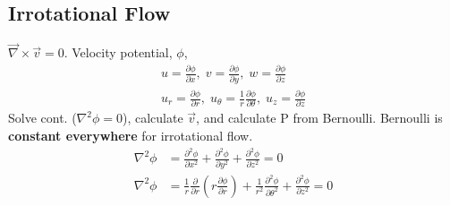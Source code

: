 \subsection{Irrotational Flow}
$\vec{\nabla} \times \vec{v} = 0$. Velocity potential, $\phi$,
\begin{gather*}
    u = \frac{\partial \phi}{\partial x}, \; v = \frac{\partial \phi}{\partial y}, \; w = \frac{\partial \phi}{\partial z} \\
    u_r = \frac{\partial \phi}{\partial r}, \; u_\theta = \frac{1}{r} \frac{\partial \phi}{\partial \theta}, \; u_z = \frac{\partial \phi}{\partial z}
\end{gather*}
Solve cont. ($\nabla^2 \phi = 0$), calculate $\vec{v}$, and calculate P from Bernoulli. Bernoulli is \textbf{constant everywhere} for irrotational flow.
\begin{align*}
    \nabla^2 \phi &= \frac{\partial^2 \phi}{\partial x^2} + \frac{\partial^2 \phi}{\partial y^2} + \frac{\partial^2 \phi}{\partial z^2} = 0\\
    \nabla^2 \phi &= \frac{1}{r} \frac{\partial}{\partial r} \left(r \frac{\partial \phi}{\partial r}\right) + \frac{1}{r^2} \frac{\partial^2 \phi}{\partial \theta^2} + \frac{\partial^2 \phi}{\partial z^2} = 0
\end{align*}
